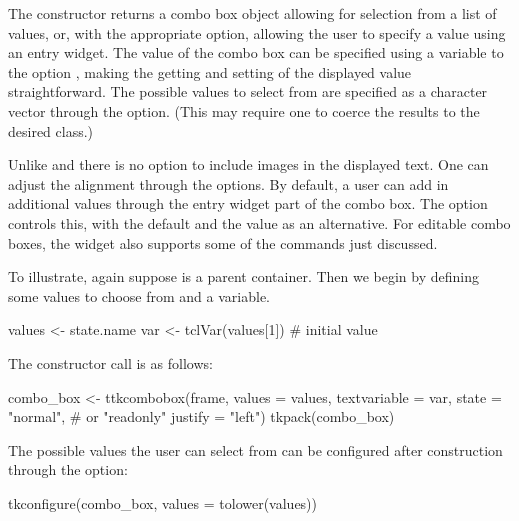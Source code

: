 The  constructor returns a combo box object
allowing for selection from a list of values, or, with the appropriate
option, allowing the user to specify a value using an entry
widget. The value of the combo box can be specified using a \TCL\/
variable to the option , making the
getting and setting of the displayed value straightforward. The
possible values to select from are specified as a character vector
through the  option. (This may require one
to coerce the results to the desired class.)

Unlike \GTK{} and \Qt{} there is no option to include images in the
displayed text. One can adjust the alignment through the
 options.  By default, a user can add in
additional values through the entry widget part of the combo box. The
 option controls this, with the default
 and the value  as an alternative. For
editable combo boxes, the widget also supports some of the
 commands just discussed.


To illustrate, again suppose  is a parent container. Then we
begin by defining some values to choose from and a \TCL\/ variable.


\begin{Schunk}
\begin{Sinput}
 values <- state.name
 var <- tclVar(values[1])              # initial value
\end{Sinput}
\end{Schunk}

The constructor call is as follows:
\begin{Schunk}
\begin{Sinput}
 combo_box <- ttkcombobox(frame,
                          values = values,
                          textvariable = var,
                          state = "normal",     # or "readonly"
                          justify = "left")
 tkpack(combo_box)
\end{Sinput}
\end{Schunk}


The possible values the user can select from can be configured after
construction through the  option:
\begin{Schunk}
\begin{Sinput}
 tkconfigure(combo_box, values = tolower(values))
\end{Sinput}
\end{Schunk}

